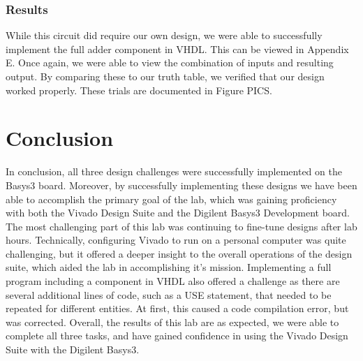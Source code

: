 \documentclass[11pt]{article}
\begin{document}
\subsubsection{Results}

While this circuit did require our own design, we were able to successfully implement the full adder component in VHDL. This can be viewed in Appendix E. Once again, we were able to view the combination of inputs and resulting output. By comparing these to our truth table, we verified that our design worked properly. These trials are documented in Figure PICS.

\section{Conclusion}

In conclusion, all three design challenges were successfully implemented on the Basys3 board. Moreover, by successfully implementing these designs we have been able to accomplish the primary goal of the lab, which was gaining proficiency with both the Vivado Design Suite and the Digilent Basys3 Development board. The most challenging part of this lab was continuing to fine-tune designs after lab hours. Technically, configuring Vivado to run on a personal computer was quite challenging, but it offered a deeper insight to the overall operations of the design suite, which aided the lab in accomplishing it's mission. Implementing a full program including a component in VHDL also offered a challenge as there are several additional lines of code, such as a USE statement, that needed to be repeated for different entities. At first, this caused a code compilation error, but was corrected. Overall, the results of this lab are as expected, we were able to complete all three tasks, and have gained confidence in using the Vivado Design Suite with the Digilent Basys3.

\pagebreak
\end{document}
